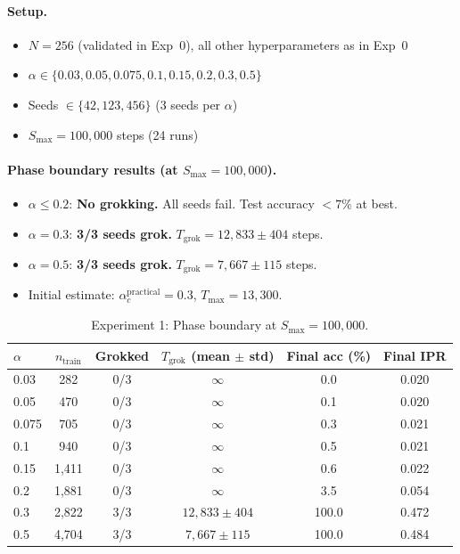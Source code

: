 \documentclass[11pt]{article}
\begin{document}
\paragraph{Setup.}
\begin{itemize}[nosep]
  \item $N = 256$ (validated in Exp~0), all other hyperparameters as in Exp~0
  \item $\alpha \in \{0.03, 0.05, 0.075, 0.1, 0.15, 0.2, 0.3, 0.5\}$
  \item Seeds $\in \{42, 123, 456\}$ (3 seeds per $\alpha$)
  \item $S_{\max} = 100{,}000$ steps (24 runs)
\end{itemize}

\paragraph{Phase boundary results (at $S_{\max} = 100{,}000$).}
\begin{itemize}[nosep]
  \item $\alpha \leq 0.2$: \textcolor{nogrokred}{\textbf{No grokking.}}
        All seeds fail. Test accuracy $< 7\%$ at best.
  \item $\alpha = 0.3$: \textcolor{grokgreen}{\textbf{3/3 seeds grok.}}
        $T_{\text{grok}} = 12{,}833 \pm 404$ steps.
  \item $\alpha = 0.5$: \textcolor{grokgreen}{\textbf{3/3 seeds grok.}}
        $T_{\text{grok}} = 7{,}667 \pm 115$ steps.
  \item Initial estimate: $\alpha_c^{\text{practical}} = 0.3$, \;$T_{\max} = 13{,}300$.
\end{itemize}

\begin{table}[h]
\centering
\caption{Experiment 1: Phase boundary at $S_{\max} = 100{,}000$.}
\label{tab:exp1}
\begin{tabular}{lccccc}
\toprule
$\alpha$ & $n_{\text{train}}$ & Grokked & $T_{\text{grok}}$ (mean $\pm$ std) & Final acc (\%) & Final IPR \\
\midrule
0.03  &    282 & 0/3 & $\infty$ &   0.0 & 0.020 \\
0.05  &    470 & 0/3 & $\infty$ &   0.1 & 0.020 \\
0.075 &    705 & 0/3 & $\infty$ &   0.3 & 0.021 \\
0.1   &    940 & 0/3 & $\infty$ &   0.5 & 0.021 \\
0.15  & 1{,}411 & 0/3 & $\infty$ &   0.6 & 0.022 \\
0.2   & 1{,}881 & 0/3 & $\infty$ &   3.5 & 0.054 \\
\rowcolor{grokgreen!15}
0.3   & 2{,}822 & 3/3 & $12{,}833 \pm 404$  & 100.0 & 0.472 \\
\rowcolor{grokgreen!15}
0.5   & 4{,}704 & 3/3 & $7{,}667 \pm 115$   & 100.0 & 0.484 \\
\bottomrule
\end{tabular}
\end{table}
\end{document}
